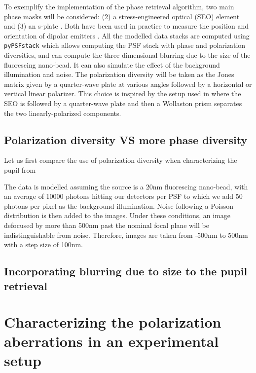 \documentclass[reprint,aps,pra,superscriptaddress,
amsmath,amssymb]{revtex4-1}
\begin{document}
To exemplify the implementation of the phase retrieval algorithm, 
two main phase masks will be considered: (2) a stress-engineered optical 
(SEO) element \cite{} and (3) an s-plate \cite{}. Both have been used in practice to measure
the position and orientation of dipolar emitters \cite{}. All the modelled
data stacks are computed using \texttt{pyPSFstack} which allows
computing the PSF stack with phase and polarization diversities, and can 
compute the three-dimensional blurring due to the size of the fluorescing
nano-bead. It can also simulate the effect of the background illumination
and noise. The polarization diversity will be taken as the Jones matrix
given by a quarter-wave plate at various angles followed by a horizontal or 
vertical linear polarizer. This choice is inspired by the setup used in \cite{}
where the SEO is followed by a quarter-wave plate and then a Wollaston
prism separates the two linearly-polarized components. 


\subsection{Polarization diversity VS more phase diversity}

Let us first compare the use of polarization diversity when characterizing the 
pupil from 

The data is modelled assuming the source is a 20nm fluorescing nano-bead,
with an average of 10000 photons hitting our detectors 
per PSF to which we add 50 photons per pixel 
as the background illumination. Noise following a Poisson distribution
is then added to the images. Under these conditions, an image defocused by more 
than 500nm past the nominal focal plane will be indistinguishable from noise. 
Therefore, images are taken from -500nm to 500nm with a step size of 100nm. 


\subsection{Incorporating blurring due to size to the pupil retrieval}

\section{Characterizing the polarization aberrations in an experimental
setup}
\end{document}
